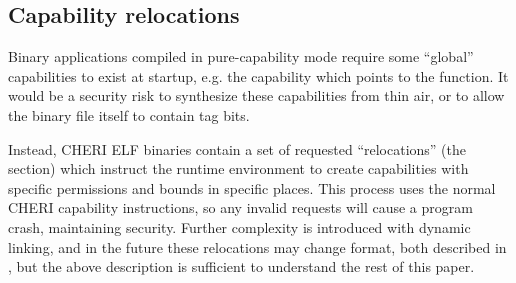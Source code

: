 \subsection{Capability relocations\label{chap:bg:subsec:cherirelocs}}
Binary applications compiled in pure-capability mode require some ``global'' capabilities to exist at startup, e.g. the capability which points to the  function.
It would be a security risk to synthesize these capabilities from thin air, or to allow the binary file itself to contain tag bits.

Instead, CHERI ELF binaries contain a set of requested ``relocations'' (the  section) which instruct the runtime environment to create capabilities with specific permissions and bounds in specific places.
This process uses the normal CHERI capability instructions, so any invalid requests will cause a program crash, maintaining security.
Further complexity is introduced with dynamic linking, and in the future these relocations may change format, both described in , but the above description is sufficient to understand the rest of this paper.

